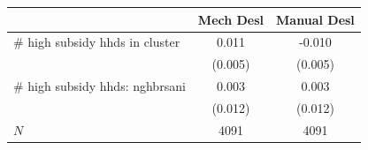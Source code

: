 \begin{tabular}{lcc}
\hline\hline
 & Mech Desl & Manual Desl \\
\hline
# high subsidy hhds in cluster & 0.011 & -0.010 \\
 & (0.005) & (0.005) \\
# high subsidy hhds: nghbrsani & 0.003 & 0.003 \\
 & (0.012) & (0.012) \\
\hline
$N$ & 4091 & 4091 \\
\hline\hline
\end{tabular}
